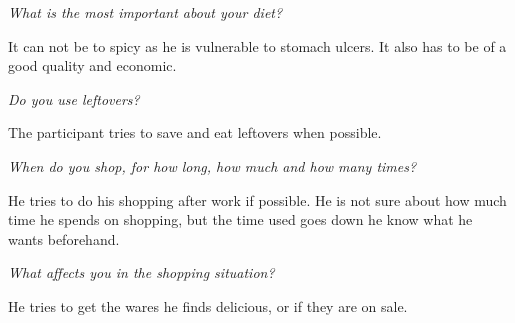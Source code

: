 \emph{What is the most important about your diet?}

It can not be to spicy as he is vulnerable to stomach ulcers. It also has to be of a good quality and economic.

\emph{Do you use leftovers?}

The participant tries to save and eat leftovers when possible.

\emph{When do you shop, for how long, how much and how many times?}

He tries to do his shopping after work if possible. He is not sure about how much time he spends on shopping, but the time used goes down he know what he wants beforehand.

\emph{What affects you in the shopping situation?}

He tries to get the wares he finds delicious, or if they are on sale.